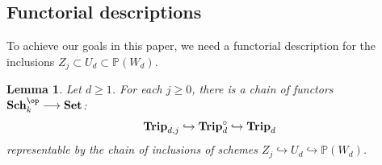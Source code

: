\documentclass[11pt]{amsart} %
\newcommand{\lar}{\longrightarrow}
\newtheorem{Lemma}[Theorem]{Lemma}
\theoremstyle{definition}
\def\Trip{{\bf Trip}}
\def\Set{{\bf Set}}
\def\Sch{{\bf Sch}}
\begin{document}
\subsection{Functorial descriptions}

To achieve our goals in this paper, we need a functorial description for the inclusions $Z_j \subset U_d \subset \mathbb{P}(W_d)$.



\begin{Lemma}\label{lem:functors-of-triples}
Let $d \geq 1$. For each $j \geq 0$, there is a chain of functors $\Sch_k^{\op} \lar \Set$:
$$
\Trip_{d,j} \hookrightarrow \Trip_{d}^{\circ} \hookrightarrow \Trip_d 
$$
representable by the chain of inclusions of schemes $Z_j \hookrightarrow U_d \hookrightarrow \mathbb{P}(W_d)$.
\end{Lemma}
\end{document}
